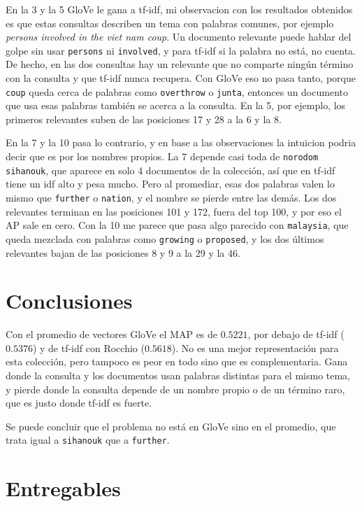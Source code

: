 \documentclass[11pt,letterpaper]{article}
\begin{document}
En la 3 y la 5 GloVe le gana a tf-idf, mi observacion con los resultados obtenidos es que estas
consultas describen un tema con palabras comunes, por ejemplo
\textit{persons involved in the viet nam coup}. Un documento relevante
puede hablar del golpe sin usar \texttt{persons} ni \texttt{involved},
y para tf-idf si la palabra no está, no cuenta. De hecho, en las dos
consultas hay un relevante que no comparte ningún término con la
consulta y que tf-idf nunca recupera. Con GloVe eso no pasa tanto,
porque \texttt{coup} queda cerca de palabras como \texttt{overthrow} o
\texttt{junta}, entonces un documento que usa esas palabras también se
acerca a la consulta. En la 5, por ejemplo, los primeros relevantes
suben de las posiciones 17 y 28 a la 6 y la 8.

En la 7 y la 10 pasa lo contrario, y en base a las observaciones la intuicion 
podria decir que es por los nombres propios. La 7 depende casi toda de \texttt{norodom sihanouk}, que
aparece en solo 4 documentos de la colección, así que en tf-idf tiene
un idf alto y pesa mucho. Pero al promediar, esas dos palabras valen lo
mismo que \texttt{further} o \texttt{nation}, y el nombre se pierde
entre las demás. Los dos relevantes terminan en las posiciones 101 y
172, fuera del top 100, y por eso el AP sale en cero. Con la 10 me
parece que pasa algo parecido con \texttt{malaysia}, que queda mezclada
con palabras como \texttt{growing} o \texttt{proposed}, y los dos
últimos relevantes bajan de las posiciones 8 y 9 a la 29 y la 46.

\section{Conclusiones}

Con el promedio de vectores GloVe el MAP es de $0.5221$, por debajo
de tf-idf ($0.5376$) y de tf-idf con Rocchio ($0.5618$). No es una
mejor representación para esta colección, pero tampoco es peor en
todo sino que es complementaria. Gana donde la consulta y los documentos usan
palabras distintas para el mismo tema, y pierde donde la consulta
depende de un nombre propio o de un término raro, que es justo donde
tf-idf es fuerte.

Se puede concluir que el problema no está en GloVe sino en el promedio,
que trata igual a \texttt{sihanouk} que a \texttt{further}.

\section*{Entregables}
\end{document}
